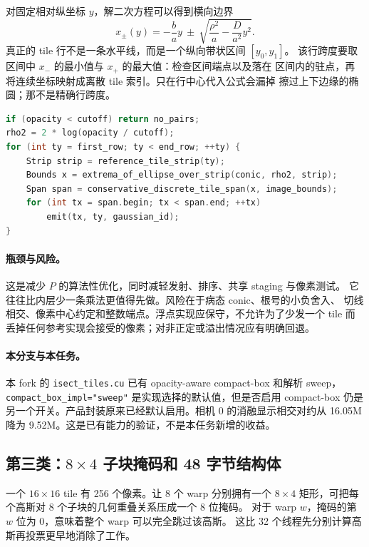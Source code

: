 对固定相对纵坐标 $y$，解二次方程可以得到横向边界
\begin{equation}
 x_\pm(y)=-\frac{b}{a}y
 \ \pm\ \sqrt{\frac{\rho^2}{a}-\frac{D}{a^2}y^2}.
\end{equation}
真正的 tile 行不是一条水平线，而是一个纵向带状区间 $[y_0,y_1]$。
该行跨度要取区间中 $x_-$ 的最小值与 $x_+$ 的最大值：检查区间端点以及落在
区间内的驻点，再将连续坐标映射成离散 tile 索引。只在行中心代入公式会漏掉
擦过上下边缘的椭圆；那不是精确行跨度。

\begin{lstlisting}[language=C++,basicstyle=\ttfamily\small,breaklines=true]
if (opacity < cutoff) return no_pairs;
rho2 = 2 * log(opacity / cutoff);
for (int ty = first_row; ty < end_row; ++ty) {
    Strip strip = reference_tile_strip(ty);
    Bounds x = extrema_of_ellipse_over_strip(conic, rho2, strip);
    Span span = conservative_discrete_tile_span(x, image_bounds);
    for (int tx = span.begin; tx < span.end; ++tx)
        emit(tx, ty, gaussian_id);
}
\end{lstlisting}

\paragraph{瓶颈与风险。}
这是减少 $P$ 的算法性优化，同时减轻发射、排序、共享 staging 与像素测试。
它往往比内层少一条乘法更值得先做。风险在于病态 conic、根号的小负舍入、
切线相交、像素中心约定和整数端点。浮点实现应保守，不允许为了少发一个 tile
而丢掉任何参考实现会接受的像素；对非正定或溢出情况应有明确回退。

\paragraph{本分支与本任务。}
本 fork 的 \texttt{isect\_tiles.cu} 已有 opacity-aware compact-box 和解析 sweep，
\texttt{compact\_box\_impl="sweep"} 是实现选择的默认值，但是否启用 compact-box
仍是另一个开关。产品封装原来已经默认启用。相机 0 的消融显示相交对约从
16.05M 降为 9.52M。这是已有能力的验证，不是本任务新增的收益。

\subsection{第三类：$8\times4$ 子块掩码和 48 字节结构体}

一个 $16\times16$ tile 有 256 个像素。让 8 个 warp 分别拥有一个
$8\times4$ 矩形，可把每个高斯对 8 个子块的几何重叠关系压成一个 8 位掩码。
对于 warp $w$，掩码的第 $w$ 位为 0，意味着整个 warp 可以完全跳过该高斯。
这比 32 个线程先分别计算高斯再投票更早地消除了工作。

